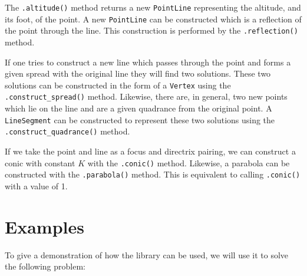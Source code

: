 The \texttt{.altitude()} method returns a new \texttt{PointLine} representing the altitude, and its foot, of the point.
A new \texttt{PointLine} can be constructed which is a reflection of the point through the line.
This construction is performed by the \texttt{.reflection()} method.

If one tries to construct a new line which passes through the point and forms a given spread with the original line they will find two solutions.
These two solutions can be constructed in the form of a \texttt{Vertex} using the \texttt{.construct\_spread()} method.
Likewise, there are, in general, two new points which lie on the line and are a given quadrance from the original point.
A \texttt{LineSegment} can be constructed to represent these two solutions using the \texttt{.construct\_quadrance()} method.

If we take the point and line as a focus and directrix pairing, we can construct a conic with constant $K$ with the \texttt{.conic()} method.
Likewise, a parabola can be constructed with the \texttt{.parabola()} method.
This is equivalent to calling \texttt{.conic()} with a value of 1.

\section{Examples}

To give a demonstration of how the library can be used, we will use it to solve the following problem:

